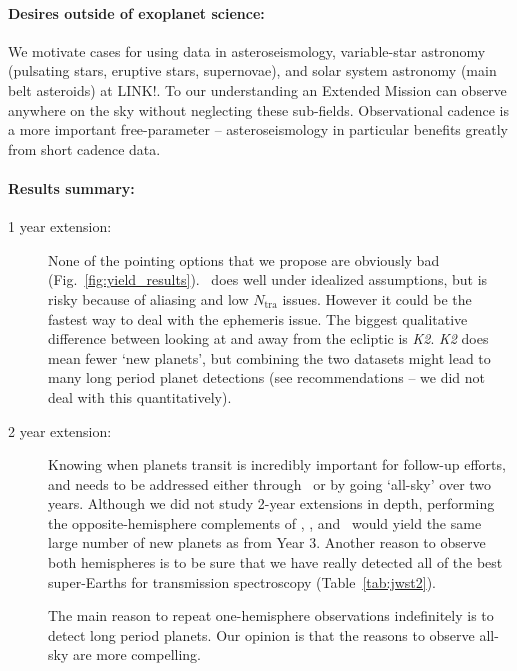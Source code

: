 \paragraph{Desires outside of exoplanet science:}
We motivate cases for using \tess data in asteroseismology, variable-star astronomy (pulsating stars, eruptive stars, supernovae), and solar system astronomy (main belt asteroids) at LINK!.
To our understanding an Extended Mission can observe anywhere on the sky without neglecting these sub-fields.
Observational cadence is a more important free-parameter -- asteroseismology in particular benefits greatly from short cadence data.


\paragraph{Results summary:}
\begin{description}
	\item[1 year extension:]
	None of the pointing options that we propose are obviously bad (Fig.~\ref{fig:yield_results}).
	\hemis\ does well under idealized assumptions, but is risky because of aliasing and low $N_\mathrm{tra}$ issues. 
	However it could be the fastest way to deal with the ephemeris issue.
	The biggest qualitative difference between looking at and away from the ecliptic is \textit{K2}.
	\textit{K2} does mean fewer `new \tess planets', but combining the two datasets might lead to many long period planet detections (see recommendations -- we did not deal with this quantitatively).
	
	\item[2 year extension:]
	Knowing when \tess planets transit is incredibly important for follow-up efforts, and needs to be addressed either through \hemis\ or by going `all-sky' over two years.
	Although we did not study 2-year extensions in depth, performing the opposite-hemisphere complements of \nhemi, \npole, and \shemiAvoid\ would yield the same large number of new planets as from Year 3.
	Another reason to observe both hemispheres is to be sure that we have really detected all of the best super-Earths for transmission spectroscopy (Table~\ref{tab:jwst2}).
	
	The main reason to repeat one-hemisphere observations indefinitely is to detect long period planets.
	Our opinion is that the reasons to observe all-sky are more compelling.
	
\end{description}



